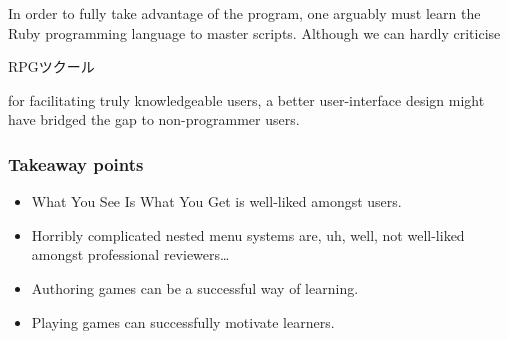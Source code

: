 In order to fully take advantage of the program, one arguably must learn the 
Ruby programming language to master scripts. Although we can hardly criticise 
\begin{CJK}{UTF8}{min}RPGツクール\end{CJK} for facilitating truly 
knowledgeable users, a better user-interface design might have bridged the gap 
to non-programmer users.

\subsubsection{Takeaway points}

\begin{itemize}
\item What You See Is What You Get is well-liked amongst users.
\item Horribly complicated nested menu systems are, uh, well, not well-liked 
    amongst professional reviewers\ldots
\item Authoring games can be a successful way of learning.
\item Playing games can successfully motivate learners.
\end{itemize}
